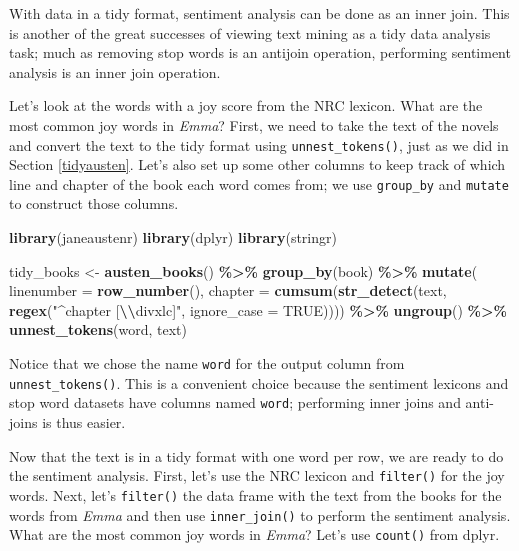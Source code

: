 \documentclass[
]{book}
\newenvironment{Shaded}{\begin{snugshade}}{\end{snugshade}}
\newcommand{\AttributeTok}[1]{\textcolor[rgb]{0.13,0.29,0.53}{#1}}
\newcommand{\ConstantTok}[1]{\textcolor[rgb]{0.56,0.35,0.01}{#1}}
\newcommand{\FunctionTok}[1]{\textcolor[rgb]{0.13,0.29,0.53}{\textbf{#1}}}
\newcommand{\NormalTok}[1]{#1}
\newcommand{\OtherTok}[1]{\textcolor[rgb]{0.56,0.35,0.01}{#1}}
\newcommand{\SpecialCharTok}[1]{\textcolor[rgb]{0.81,0.36,0.00}{\textbf{#1}}}
\newcommand{\StringTok}[1]{\textcolor[rgb]{0.31,0.60,0.02}{#1}}
\begin{document}
With data in a tidy format, sentiment analysis can be done as an inner join. This is another of the great successes of viewing text mining as a tidy data analysis task; much as removing stop words is an antijoin operation, performing sentiment analysis is an inner join operation.

Let's look at the words with a joy score from the NRC lexicon. What are the most common joy words in \emph{Emma}? First, we need to take the text of the novels and convert the text to the tidy format using \texttt{unnest\_tokens()}, just as we did in Section \ref{tidyausten}. Let's also set up some other columns to keep track of which line and chapter of the book each word comes from; we use \texttt{group\_by} and \texttt{mutate} to construct those columns.

\begin{Shaded}
\begin{Highlighting}[]
\FunctionTok{library}\NormalTok{(janeaustenr)}
\FunctionTok{library}\NormalTok{(dplyr)}
\FunctionTok{library}\NormalTok{(stringr)}

\NormalTok{tidy\_books }\OtherTok{\textless{}{-}} \FunctionTok{austen\_books}\NormalTok{() }\SpecialCharTok{\%\textgreater{}\%}
  \FunctionTok{group\_by}\NormalTok{(book) }\SpecialCharTok{\%\textgreater{}\%}
  \FunctionTok{mutate}\NormalTok{(}
    \AttributeTok{linenumber =} \FunctionTok{row\_number}\NormalTok{(),}
    \AttributeTok{chapter =} \FunctionTok{cumsum}\NormalTok{(}\FunctionTok{str\_detect}\NormalTok{(text, }
                                \FunctionTok{regex}\NormalTok{(}\StringTok{"\^{}chapter [}\SpecialCharTok{\textbackslash{}\textbackslash{}}\StringTok{divxlc]"}\NormalTok{, }
                                      \AttributeTok{ignore\_case =} \ConstantTok{TRUE}\NormalTok{)))) }\SpecialCharTok{\%\textgreater{}\%}
  \FunctionTok{ungroup}\NormalTok{() }\SpecialCharTok{\%\textgreater{}\%}
  \FunctionTok{unnest\_tokens}\NormalTok{(word, text)}
\end{Highlighting}
\end{Shaded}

Notice that we chose the name \texttt{word} for the output column from \texttt{unnest\_tokens()}. This is a convenient choice because the sentiment lexicons and stop word datasets have columns named \texttt{word}; performing inner joins and anti-joins is thus easier.

Now that the text is in a tidy format with one word per row, we are ready to do the sentiment analysis. First, let's use the NRC lexicon and \texttt{filter()} for the joy words. Next, let's \texttt{filter()} the data frame with the text from the books for the words from \emph{Emma} and then use \texttt{inner\_join()} to perform the sentiment analysis. What are the most common joy words in \emph{Emma}? Let's use \texttt{count()} from dplyr.
\end{document}
